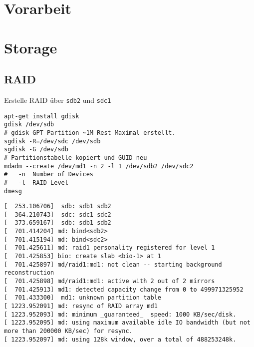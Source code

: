 \chapter{Vorarbeit}

\chapter{Storage}
\section{RAID}
Erstelle RAID über \verb#sdb2# und \verb#sdc1#
\begin{verbatim}
apt-get install gdisk
gdisk /dev/sdb
# gdisk GPT Partition ~1M Rest Maximal erstellt.
sgdisk -R=/dev/sdc /dev/sdb
sgdisk -G /dev/sdb
# Partitionstabelle kopiert und GUID neu
mdadm --create /dev/md1 -n 2 -l 1 /dev/sdb2 /dev/sdc2
#	-n	Number of Devices
#	-l	RAID Level
dmesg
\end{verbatim}
\setupVerbatimOut
\begin{verbatim}
[  253.106706]  sdb: sdb1 sdb2
[  364.210743]  sdc: sdc1 sdc2
[  373.659167]  sdb: sdb1 sdb2
[  701.414204] md: bind<sdb2>
[  701.415194] md: bind<sdc2>
[  701.425611] md: raid1 personality registered for level 1
[  701.425853] bio: create slab <bio-1> at 1
[  701.425897] md/raid1:md1: not clean -- starting background reconstruction
[  701.425898] md/raid1:md1: active with 2 out of 2 mirrors
[  701.425913] md1: detected capacity change from 0 to 499971325952
[  701.433300]  md1: unknown partition table
[ 1223.952091] md: resync of RAID array md1
[ 1223.952093] md: minimum _guaranteed_  speed: 1000 KB/sec/disk.
[ 1223.952095] md: using maximum available idle IO bandwidth (but not more than 200000 KB/sec) for resync.
[ 1223.952097] md: using 128k window, over a total of 488253248k.
\end{verbatim}

